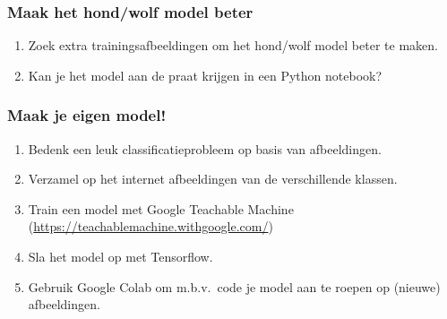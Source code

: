 \documentclass[aspectratio=169]{beamer}
\begin{document}


\begin{frame}
\frametitle{Maak het hond/wolf model beter}

\begin{enumerate}
\item Zoek extra trainingsafbeeldingen om het hond/wolf model beter te maken.
\item Kan je het model aan de praat krijgen in een Python notebook?
\end{enumerate}

\end{frame}


\begin{frame}
\frametitle{Maak je eigen model!}

\begin{enumerate}
\item Bedenk een leuk classificatieprobleem op basis van afbeeldingen.
\item Verzamel op het internet afbeeldingen van de verschillende klassen.
\item Train een model met Google Teachable Machine (\url{https://teachablemachine.withgoogle.com/})
\item Sla het model op met Tensorflow.
\item Gebruik Google Colab om m.b.v.\ code je model aan te roepen op (nieuwe) afbeeldingen.
\end{enumerate}
\end{frame}

\end{document}
